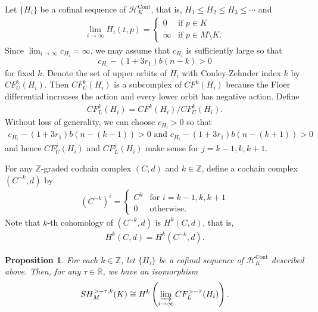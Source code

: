 \documentclass[12pt]{amsart}
\newtheorem{proposition}[theorem]{Proposition}
\theoremstyle{definition}
\newcommand{\RR}{{\mathbb R}}
\newcommand{\ZZ}{{\mathbb Z}}
\begin{document}
\vspace{0.2cm}

Let $\{H_i\}$ be a cofinal sequence of $\mathcal{H}_K^{\text{Cont}}$, that is, $H_1 \leq H_2 \leq H_3\leq \cdots$ and 
\begin{align*}
    \lim_{i \to \infty} H_i(t,p) = \begin{cases}
 0&\textrm{if}\,\,p \in K\\
 \infty &\textrm{if}\,\,p \in M \setminus K.
    \end{cases}
\end{align*}
Since $\displaystyle \lim_{i \to \infty} c_{H_i} = \infty$, we may assume that $c_{H_i}$ is sufficiently large so that $$c_{H_i} - (1+3r_1)b(n-k) >0$$ for fixed $k$. Denote the set of upper orbits of $H_i$ with Conley-Zehnder index $k$ by $CF^k_{U}(H_i)$.
Then $CF^k_{U}(H_i)$ is a subcomplex of $CF^k(H_i)$ because the Floer differential increases the action and every lower orbit has negative action. Define
\begin{align*}
    CF^k_{L}(H_i) = CF^k(H_i)/CF^k_{U}(H_i).
\end{align*}
Without loss of generality, we can choose $c_{H_i}>0$ so that
\begin{align*}
    c_{H_i} - (1+3r_1)b\left(n-(k-1)\right) >0\,\,\textrm{and}\,\,c_{H_i} - (1+3r_1)b(n-(k+1)) >0
\end{align*}
and hence $CF^j_{U}(H_i)$ and $CF^j_{L}(H_i)$ make sense for $j = k-1,k,k+1$.

\vspace{0.2 cm}

For any $\ZZ$-graded cochain complex $(C,d)$ and $k\in \ZZ$, define a cochain complex $(C^{\sim k},d)$ by
\begin{align*}
    \left(C^{\sim k}\right)^i = \begin{cases}
        C^k&\textrm{for}\,\,i=k-1,k,k+1\\
        0&\textrm{otherwise}.
    \end{cases}
\end{align*}
Note that $k$-th cohomology of $(C^{\sim k},d)$ is $H^k(C,d)$, that is,
\begin{align}\label{kth}
 H^k(C,d) = H^k(C^{\sim k},d).   
\end{align}
 
\begin{proposition}\label{lower}
 For each $k\in\ZZ$, let $\{H_i\}$ be a cofinal sequence of $\mathcal{H}_K^{\text{Cont}}$ described above. Then, for any $\tau \in \RR$, we have an isomorphism
    \begin{align*}
        SH^{>-\tau,k}_M(K) \cong H^k \left( \varinjlim_{i \to \infty} CF^{>-\tau}_{L}(H_i) \right).
    \end{align*}
        
\end{proposition}
\end{document}
